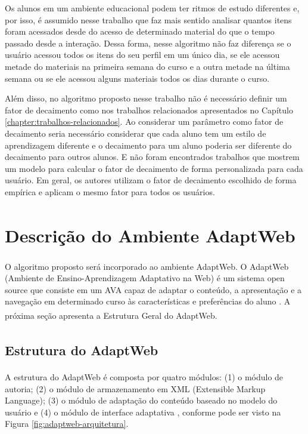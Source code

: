 Os alunos em um ambiente educacional podem ter ritmos de estudo diferentes e, por isso, é assumido nesse trabalho que faz
mais sentido analisar quantos itens foram acessados desde do acesso de determinado material do que o tempo passado desde
a interação. Dessa forma, nesse algoritmo não faz diferença se o usuário acessou todos os itens do seu perfil em um
único dia, se ele acessou metade do materiais na primeira semana do curso e a outra metade na última semana ou se ele
acessou alguns materiais todos os dias durante o curso.

Além disso, no algoritmo proposto nesse trabalho não é necessário definir um fator de decaimento como nos trabalhos
relacionados apresentados no Capítulo \ref{chapter:trabalhos-relacionados}. Ao considerar um parâmetro como fator de decaimento seria necessário considerar
que cada aluno tem um estilo de aprendizagem diferente e o decaimento para um aluno poderia ser diferente do decaimento
para outros alunos. E não foram encontrados trabalhos que mostrem um modelo para calcular o fator de decaimento de forma
personalizada para cada usuário. Em geral, os autores utilizam o fator de decaimento escolhido de forma empírica e
aplicam o mesmo fator para todos os usuários.

\section{Descrição do Ambiente AdaptWeb\textsuperscript{\textregistered}}

O algoritmo proposto será incorporado ao ambiente AdaptWeb\textsuperscript{\textregistered}. O
AdaptWeb\textsuperscript{\textregistered} (Ambiente de Ensino-Aprendizagem Adaptativo na Web) é um sistema open source
que consiste em um AVA capaz de adaptar o conteúdo, a apresentação e a navegação em determinado curso às características
e preferências do aluno \cite{gasparini2009adaptweb}. A próxima seção apresenta a Estrutura Geral do
AdaptWeb\textsuperscript{\textregistered}.

\subsection{Estrutura do AdaptWeb\textsuperscript{\textregistered}}

A estrutura do AdaptWeb\textsuperscript{\textregistered} é composta por quatro módulos: (1) o módulo de autoria; (2) o
módulo de armazenamento em XML (Extensible Markup Language); (3) o módulo de adaptação do conteúdo baseado no modelo do
usuário e (4) o módulo de interface adaptativa \cite{gasparini2003interface}, conforme pode ser visto na Figura
\ref{fig:adaptweb-arquitetura}.

